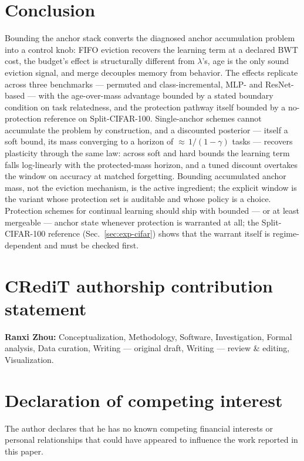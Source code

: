 \documentclass[review,11pt,number]{elsarticle}
\begin{document}
\section{Conclusion}
\label{sec:conclusion}

Bounding the anchor stack converts the diagnosed anchor accumulation
problem into a control knob: FIFO eviction recovers the learning term
at a declared BWT cost, the budget's effect is structurally different
from $\lambda$'s, age is the only sound eviction signal, and merge
decouples memory from behavior. The effects replicate across three
benchmarks --- permuted and class-incremental, MLP- and ResNet-based ---
with the age-over-mass advantage bounded by a stated boundary condition
on task relatedness, and the protection pathway itself bounded by a
no-protection reference on Split-CIFAR-100. Single-anchor schemes
cannot accumulate the problem by construction, and a discounted
posterior --- itself a soft bound, its mass converging to a horizon of
${\approx}\,1/(1-\gamma)$ tasks --- recovers plasticity through the
same law: across soft and hard bounds the learning term falls
log-linearly with the protected-mass horizon, and a tuned discount
overtakes the window on accuracy at matched forgetting. Bounding
accumulated anchor mass, not the eviction mechanism, is the active
ingredient; the explicit window is the variant whose protection set is
auditable and whose policy is a choice. Protection schemes for continual
learning should ship with bounded --- or at least mergeable --- anchor
state whenever protection is warranted at all; the Split-CIFAR-100
reference (Sec.~\ref{sec:exp-cifar}) shows that the warrant itself is
regime-dependent and must be checked first.


\section*{CRediT authorship contribution statement}
\textbf{Ranxi Zhou:} Conceptualization, Methodology, Software,
Investigation, Formal analysis, Data curation, Writing --- original
draft, Writing --- review \& editing, Visualization.

\section*{Declaration of competing interest}
The author declares that he has no known competing financial interests
or personal relationships that could have appeared to influence the
work reported in this paper.
\end{document}
